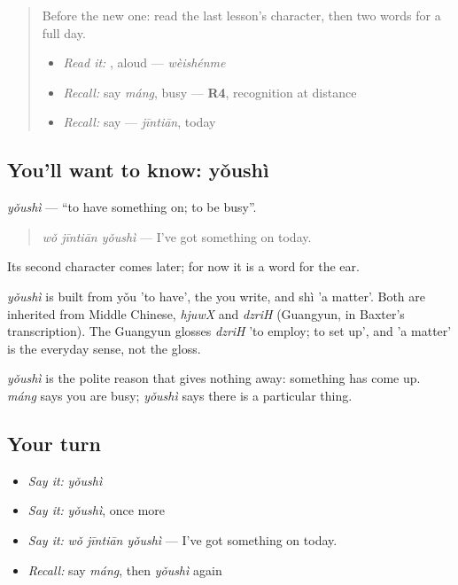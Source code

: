 \begin{quote}
Before the new one: read the last lesson's character, then two words for a full day.

\begin{itemize}
\raggedright
  \item \emph{Read it:} , aloud — \emph{wèishénme}
  \item \emph{Recall:} say \emph{máng}, busy — \textbf{R4}, recognition at distance
  \item \emph{Recall:} say  — \emph{jīntiān}, today
\end{itemize}
\end{quote}

\subsection*{You'll want to know: yǒushì}
\emph{yǒushì} — \textquotedblleft{}to have something on; to be busy\textquotedblright{}.

\begin{quote}
\emph{wǒ jīntiān yǒushì} — I've got something on today.
\end{quote}

Its second character comes later; for now it is a word for the ear.

\begin{cousinweb}
\emph{yǒushì} is built from yǒu 'to have', the  you write, and shì 'a matter'. Both are inherited from Middle Chinese, \emph{hjuwX} and \emph{dzriH} (Guangyun, in Baxter's transcription). The Guangyun glosses \emph{dzriH} 'to employ; to set up', and 'a matter' is the everyday sense, not the gloss.
\end{cousinweb}

\begin{grammarlens}[title={What you've built}]
\emph{yǒushì} is the polite reason that gives nothing away: something has come up. \emph{máng} says you are busy; \emph{yǒushì} says there is a particular thing.
\end{grammarlens}

\subsection*{Your turn}
\begin{itemize}
\raggedright
  \item \emph{Say it:} \emph{yǒushì}
  \item \emph{Say it:} \emph{yǒushì}, once more
  \item \emph{Say it:} \emph{wǒ jīntiān yǒushì} — I've got something on today.
  \item \emph{Recall:} say \emph{máng}, then \emph{yǒushì} again
\end{itemize}

